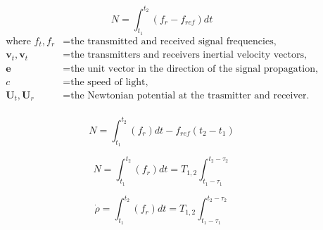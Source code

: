 \begin{equation}
    N = \int_{t_1}^{t_2}(f_r-f_{ref})dt
\end{equation}
\begin{equation*}
    \begin{aligned}
        \textrm{where  }
        f_t, f_r & = \textrm{the transmitted and received signal frequencies,}            \\
        \mathbf{v}_t, \mathbf{v}_t & = \textrm{the transmitters and receivers inertial velocity vectors,}   \\
        \mathbf{e}                 & = \textrm{the unit vector in the direction of the signal propagation,} \\
        c                          & = \textrm{the speed of light,}                                         \\
        \mathbf{U}_t, \mathbf{U}_r & = \textrm{the Newtonian potential at the trasmitter and receiver.}     \\
    \end{aligned}
\end{equation*}

\begin{equation}
    N = \int_{t_1}^{t_2}(f_r)dt-f_{ref}(t_2-t_1)
\end{equation}

\begin{equation}
    N = \int_{t_1}^{t_2}(f_r)dt = T_{1,2}\int_{t_1-\tau_1}^{t_2-\tau_2}
\end{equation}

\begin{equation}
    \dot{\rho} = \int_{t_1}^{t_2}(f_r)dt = T_{1,2}\int_{t_1-\tau_1}^{t_2-\tau_2}
\end{equation}





